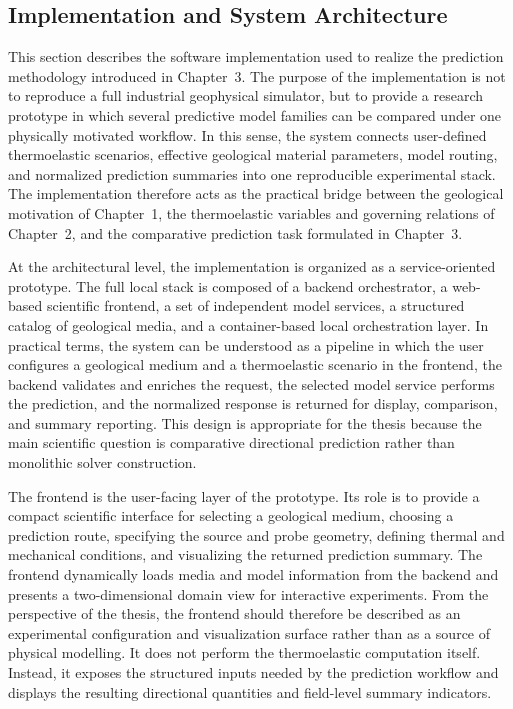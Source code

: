 \subsection{Implementation and System Architecture}

This section describes the software implementation used to realize the prediction methodology introduced in Chapter~3. The purpose of the implementation is not to reproduce a full industrial geophysical simulator, but to provide a research prototype in which several predictive model families can be compared under one physically motivated workflow. In this sense, the system connects user-defined thermoelastic scenarios, effective geological material parameters, model routing, and normalized prediction summaries into one reproducible experimental stack. The implementation therefore acts as the practical bridge between the geological motivation of Chapter~1, the thermoelastic variables and governing relations of Chapter~2, and the comparative prediction task formulated in Chapter~3.

At the architectural level, the implementation is organized as a service-oriented prototype. The full local stack is composed of a backend orchestrator, a web-based scientific frontend, a set of independent model services, a structured catalog of geological media, and a container-based local orchestration layer. In practical terms, the system can be understood as a pipeline in which the user configures a geological medium and a thermoelastic scenario in the frontend, the backend validates and enriches the request, the selected model service performs the prediction, and the normalized response is returned for display, comparison, and summary reporting. This design is appropriate for the thesis because the main scientific question is comparative directional prediction rather than monolithic solver construction.

The frontend is the user-facing layer of the prototype. Its role is to provide a compact scientific interface for selecting a geological medium, choosing a prediction route, specifying the source and probe geometry, defining thermal and mechanical conditions, and visualizing the returned prediction summary. The frontend dynamically loads media and model information from the backend and presents a two-dimensional domain view for interactive experiments. From the perspective of the thesis, the frontend should therefore be described as an experimental configuration and visualization surface rather than as a source of physical modelling. It does not perform the thermoelastic computation itself. Instead, it exposes the structured inputs needed by the prediction workflow and displays the resulting directional quantities and field-level summary indicators.

